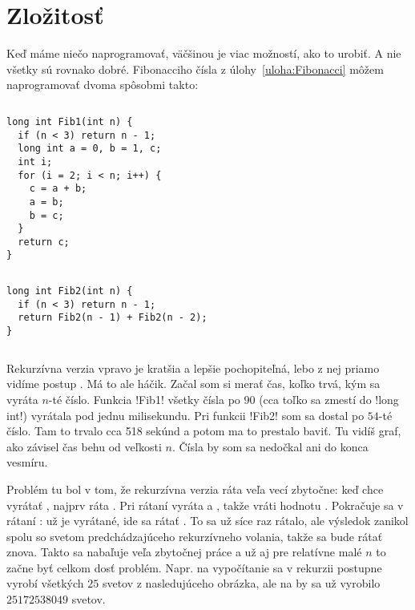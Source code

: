 \chapter{Zložitosť}
\label{sect:zlozitost}
\def\longCharts{1}

Keď máme niečo naprogramovať, väčšinou je viac možností, ako to urobiť. A nie všetky sú 
rovnako dobré. Fibonacciho čísla z úlohy~\ref{uloha:Fibonacci} môžem naprogramovať
dvoma spôsobmi takto:


\begin{column}{0.45}
\begin{lstlisting}[] 
long int Fib1(int n) {
  if (n < 3) return n - 1;
  long int a = 0, b = 1, c;
  int i;
  for (i = 2; i < n; i++) {
    c = a + b;
    a = b;
    b = c;
  }
  return c;
}
\end{lstlisting}
\end{column}
\hfil
\begin{column}{0.45}
\begin{lstlisting}[] 
long int Fib2(int n) {
  if (n < 3) return n - 1;
  return Fib2(n - 1) + Fib2(n - 2);
}
\end{lstlisting}
\end{column}


Rekurzívna verzia vpravo je kratšia a lepšie pochopiteľná, lebo z nej priamo vidíme
postup .
Má to ale háčik. Začal som si merať čas, koľko trvá, kým sa vyráta $n$-té číslo. 
Funkcia \prg!Fib1! všetky čísla po $90$ (cca toľko sa zmestí do \prg!long int!) vyrátala
pod jednu milisekundu. Pri funkcii \prg!Fib2! som sa dostal po $54$-té číslo. Tam to trvalo
cca 518 sekúnd a potom ma to prestalo baviť. Tu vidíš graf, ako závisel čas behu od veľkosti
$n$. Čísla  by som sa nedočkal ani do konca vesmíru.\\




Problém tu bol v tom, že rekurzívna verzia ráta veľa vecí zbytočne: keď chce vyrátať
, najprv ráta . Pri rátaní  vyráta 
a , takže vráti hodnotu . Pokračuje sa v rátaní
:  už je vyrátané, ide sa 
 rátať . To sa už síce raz rátalo, ale výsledok
zanikol spolu so svetom predchádzajúceho rekurzívneho volania, takže sa bude rátať
znova. Takto sa nabaľuje veľa 
zbytočnej práce a už aj pre relatívne malé $n$ to začne byť celkom dosť problém.
Napr. na vypočítanie  sa v rekurzii postupne vyrobí všetkých $25$ svetov
z nasledujúceho obrázka, ale na  by sa už vyrobilo $25172538049$ svetov.\\

